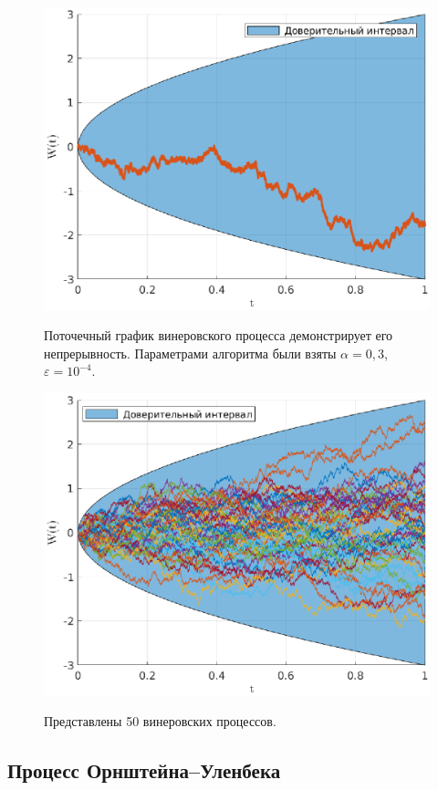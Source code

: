 \clearpage
\begin{figure}[t]
        \noindent
        \centering
        {
                \includegraphics[width=120mm]{task_09/weiner.eps}
        }
        \caption{Поточечный график винеровского процесса демонстрирует его непрерывность. Параметрами алгоритма были взяты $\alpha = 0,\!3$, $\varepsilon = 10^{-4}$.}
\end{figure}
\begin{figure}[b]
        \noindent
        \centering
        {
                \includegraphics[width=120mm]{task_09/50-weiners.eps}
        }
        \caption{Представлены 50 винеровских процессов.}
\end{figure}
\clearpage


\subsection{Процесс Орнштейна--Уленбека}

